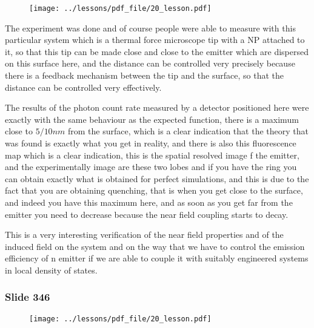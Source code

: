 \documentclass[../main/main.tex]{subfiles}
\begin{document}
\begin{figure}[h!]
\centering
\texttt{[image: ../lessons/pdf\_file/20\_lesson.pdf]}
\end{figure}

The experiment was done and of course people were able to measure with this particular system which is a thermal force microscope tip with a NP attached to it, so that this tip can be made close and close to the emitter which are dispersed on this surface here, and the distance can be controlled very precisely because there is a feedback mechanism between the tip and the surface, so that the distance can be controlled very effectively.

The results of the photon count rate measured by a detector positioned here were exactly with the same behaviour as the expected function, there is a maximum close to $5/10 nm$ from the surface, which is a clear indication that the theory that was found is exactly what you get in reality, and there is also this fluorescence map which is a clear indication, this is the spatial resolved image f the emitter, and the experimentally image are these two lobes and if you have the ring you can obtain exactly what is obtained for perfect simulations, and this is due to the fact that you are obtaining quenching, that is when you get close to the surface, and indeed you have this maximum here, and as soon as you get far from the emitter you need to decrease because the near field coupling starts to decay.

This is a very interesting verification of the near field properties and of the induced field on the system and on the way that we have to control the emission efficiency of n emitter if we are able to couple it with suitably engineered systems in local density of states.

\newpage

\subsubsection{Slide 346}

\begin{figure}[h!]
\centering
\texttt{[image: ../lessons/pdf\_file/20\_lesson.pdf]}
\end{figure}
\end{document}
